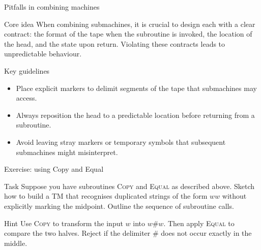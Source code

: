 \begin{frame}[t]{Pitfalls in combining machines}
  \begin{tblock}{Core idea}
    When combining submachines, it is crucial to design each with a
    clear contract: the format of the tape when the subroutine is
    invoked, the location of the head, and the state upon return.
    Violating these contracts leads to unpredictable behaviour.
  \end{tblock}
  \begin{tblock}{Key guidelines}
    \begin{itemize}
      \item Place explicit markers to delimit segments of the tape
        that submachines may access.
      \item Always reposition the head to a predictable location before
        returning from a subroutine.
      \item Avoid leaving stray markers or temporary symbols that
        subsequent submachines might misinterpret.
    \end{itemize}
  \end{tblock}
  \label{fr:7.4-10}
\end{frame}

\begin{frame}[t]{Exercise: using Copy and Equal}
  \begin{tblock}{Task}
    Suppose you have subroutines \textsc{Copy} and \textsc{Equal} as
    described above.  Sketch how to build a TM that recognises
    duplicated strings of the form $ww$ without explicitly marking the
    midpoint.  Outline the sequence of subroutine calls.
  \end{tblock}
  \begin{talert}{Hint}
    Use \textsc{Copy} to transform the input $w$ into $w\#w$.  Then
    apply \textsc{Equal} to compare the two halves.  Reject if the
    delimiter $\#$ does not occur exactly in the middle.
  \end{talert}
  \label{fr:7.4-11}
\end{frame}

